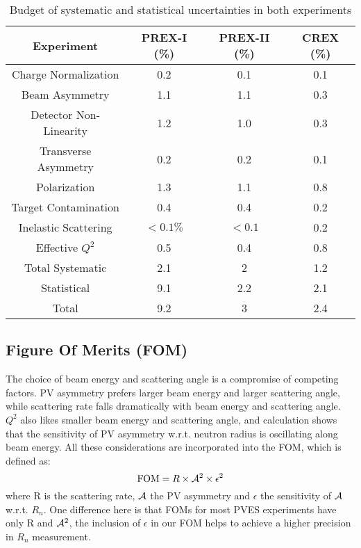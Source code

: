 \begin{table}[!h]
    \centering
    \begin{tabular}{c| c c c}
	\hline
	Experiment  & PREX-I (\%)   & PREX-II (\%)	& CREX (\%)	\\
	\hline
	Charge Normalization	& 0.2	& 0.1	& 0.1	\\
	Beam Asymmetry		& 1.1	& 1.1	& 0.3	\\
	Detector Non-Linearity	& 1.2	& 1.0	& 0.3	\\
	Transverse Asymmetry	& 0.2	& 0.2	& 0.1	\\
	Polarization		& 1.3	& 1.1	& 0.8	\\
	Target Contamination	& 0.4	& 0.4	& 0.2	\\
	Inelastic Scattering	& $<0.1\%$  & $<0.1$    & 0.2   \\
	Effective $Q^2$		& 0.5	& 0.4	& 0.8	\\
	\hline
	Total Systematic	& 2.1	& 2	& 1.2	\\
	Statistical		& 9.1	& 2.2	& 2.1	\\
	\hline
	Total			& 9.2	& 3	& 2.4	\\
	\hline
    \end{tabular}
    \caption{Budget of systematic and statistical uncertainties in both experiments 
    \cite{prex-II_proposal, crex_proposal}
    }
\end{table}


\subsection{Figure Of Merits (FOM)}
The choice of beam energy and scattering angle is a compromise of competing
factors. PV asymmetry prefers larger beam energy and larger scattering angle,
while scattering rate falls dramatically with beam energy and scattering angle.
$Q^2$ also likes smaller beam energy and scattering angle, and calculation 
shows that the sensitivity of PV asymmetry w.r.t. neutron radius is oscillating
along beam energy. All these considerations are incorporated into the FOM, which
is defined as:
\begin{equation}
    \text{FOM} = R \times \mathcal{A}^2 \times \epsilon^2
\end{equation}
where R is the scattering rate, $\mathcal{A}$ the PV asymmetry and $\epsilon$ 
the sensitivity of $\mathcal{A}$ w.r.t. $R_n$. One difference here is that FOMs for most PVES 
experiments have only R and $\mathcal{A}^2$, the inclusion of $\epsilon$ in our FOM helps
to achieve a higher precision in $R_n$ measurement.

